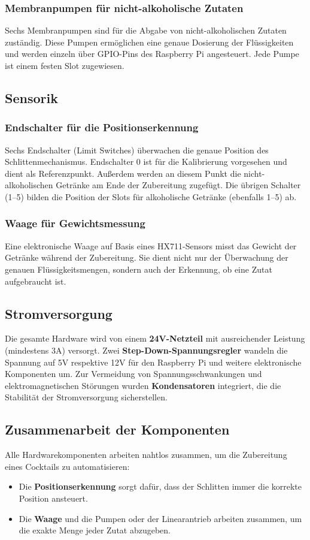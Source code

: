 \subsubsection{Membranpumpen für nicht-alkoholische Zutaten}
Sechs Membranpumpen sind für die Abgabe von nicht-alkoholischen Zutaten zuständig. Diese Pumpen ermöglichen eine genaue Dosierung der Flüssigkeiten und werden einzeln über GPIO-Pins des Raspberry Pi angesteuert. Jede Pumpe ist einem festen Slot zugewiesen.

\subsection{Sensorik}
\subsubsection{Endschalter für die Positionserkennung}
Sechs Endschalter (Limit Switches) überwachen die genaue Position des Schlittenmechanismus. Endschalter 0 ist für die Kalibrierung vorgesehen und dient als Referenzpunkt. Außerdem werden an diesem Punkt die nicht-alkoholischen Getränke am Ende der Zubereitung zugefügt. Die übrigen Schalter (1--5) bilden die Position der Slots für alkoholische Getränke (ebenfalls 1--5) ab.

\subsubsection{Waage für Gewichtsmessung}
Eine elektronische Waage auf Basis eines HX711-Sensors misst das Gewicht der Getränke während der Zubereitung. Sie dient nicht nur der Überwachung der genauen Flüssigkeitsmengen, sondern auch der Erkennung, ob eine Zutat aufgebraucht ist.

\subsection{Stromversorgung}
Die gesamte Hardware wird von einem \textbf{24V-Netzteil} mit ausreichender Leistung (mindestens 3A) versorgt. Zwei \textbf{Step-Down-Spannungsregler} wandeln die Spannung auf 5V respektive 12V für den Raspberry Pi und weitere elektronische Komponenten um. Zur Vermeidung von Spannungsschwankungen und elektromagnetischen Störungen wurden \textbf{Kondensatoren} integriert, die die Stabilität der Stromversorgung sicherstellen.

\subsection{Zusammenarbeit der Komponenten}
Alle Hardwarekomponenten arbeiten nahtlos zusammen, um die Zubereitung eines Cocktails zu automatisieren:
\begin{itemize}
    \item Die \textbf{Positionserkennung} sorgt dafür, dass der Schlitten immer die korrekte Position ansteuert.
    \item Die \textbf{Waage} und die Pumpen oder der Linearantrieb arbeiten zusammen, um die exakte Menge jeder Zutat abzugeben.
\end{itemize}

